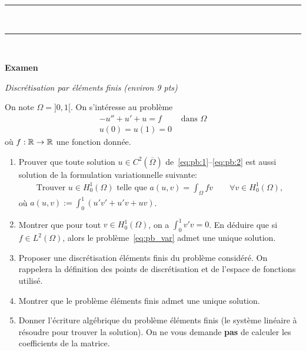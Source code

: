 \documentclass[12pt]{article}
\begin{document}
\noindent
{\rule{\textwidth}{.2mm}}\\
\renewcommand{\labelenumi}{(\alph{enumi})}

{\rule{\textwidth}{.2mm}}\\




\setcounter{MaxMatrixCols}{15} %

\begin{center}
{\bf Examen}
\end{center}

\begin{exo}
  \textit{Discr\'etisation par \'el\'ements finis (environ 9 pts)}

  On note $\Omega = ]0,1[$. On s'int\'eresse au probl\`eme
  \begin{align}
    \label{eq:pb:1}
    -u'' + u' + u = f & \text{ dans } \Omega
    \\
    \label{eq:pb:2}
    u(0) = u(1) = 0 &
  \end{align}
  o\`u $f : \mathbb{R} \to \mathbb{R}$ une fonction donn\'ee.
  
  \begin{enumerate}
  \item Prouver que toute solution $u \in C^2(\overline{\Omega})$ de~\eqref{eq:pb:1}--\eqref{eq:pb:2}
    est aussi solution de la formulation variationnelle suivante:
    \begin{align}
      \label{eq:pb_var}
      \text{Trouver } u \in H^1_{0}(\Omega) \text{ telle que }
      a(u,v)
      = \int_{\Omega} f v \qquad
      \forall v \in H^{1}_0(\Omega) ,
    \end{align}
    o\`u $a(u,v) := \int_{0}^1 ( u' v' + u' v + u v )$.
  \item Montrer que pour tout $v \in H^1_0(\Omega)$,
    on a $\int_0^1 v' v = 0$.
    En d\'eduire que si $f \in L^2(\Omega)$, alors
    le probl\`eme~\eqref{eq:pb_var} admet une unique solution.

  \item Proposer une discr\'etisation \'el\'ements finis du probl\`eme consid\'er\'e.
    On rappelera la d\'efinition des points de discr\'etisation et de l'espace de fonctions utilis\'e.

  \item Montrer que le probl\`eme \'el\'ements finis admet une unique solution.

  \item Donner l'\'ecriture alg\'ebrique du probl\`eme \'el\'ements finis
    (le syst\`eme lin\'eaire \`a r\'esoudre pour trouver la solution).
    On ne vous demande \textbf{pas} de calculer les coefficients de la matrice.
  \end{enumerate}

\end{exo}
\end{document}
